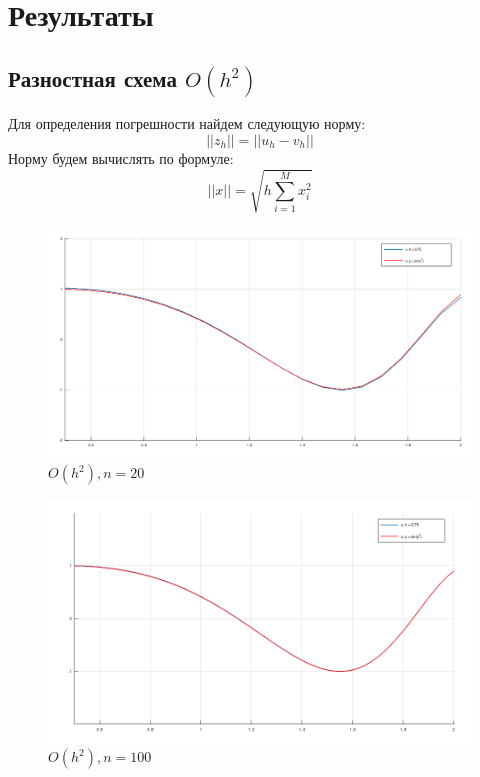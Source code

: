 \documentclass[12pt]{article}
\begin{document}
\section{Результаты}

\subsection{Разностная схема $O(h^2)$}

Для определения погрешности найдем следующую норму:
$$
||z_h|| = || u_h - v_h ||
$$
Норму будем вычислять по формуле:
$$
||x|| = \sqrt{h\sum\limits_{i=1}^M x_i^2}
$$

\begin{figure}
\begin{center}
\includegraphics[scale = 0.4]{h2_20.png} 
\end{center}
\caption{$O(h^2), n = 20$ }
\end{figure}

\begin{figure}
\begin{center}
\includegraphics[scale = 0.4]{h2_100.png} 
\end{center}
\caption{$O(h^2), n = 100$ }
\end{figure}
\end{document}
